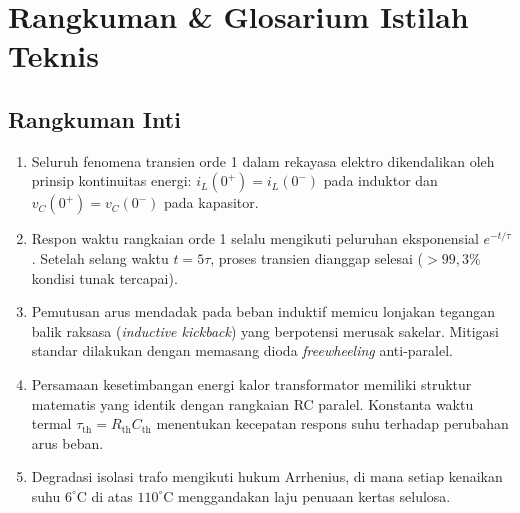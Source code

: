 \documentclass[11pt,a4paper]{article}
\theoremstyle{definition}
\begin{document}
\section{Rangkuman \& Glosarium Istilah Teknis}

\subsection{Rangkuman Inti}
\begin{enumerate}[leftmargin=*]
    \item Seluruh fenomena transien orde 1 dalam rekayasa elektro dikendalikan oleh prinsip kontinuitas energi: $i_L(0^+) = i_L(0^-)$ pada induktor dan $v_C(0^+) = v_C(0^-)$ pada kapasitor.
    \item Respon waktu rangkaian orde 1 selalu mengikuti peluruhan eksponensial $e^{-t/\tau}$. Setelah selang waktu $t = 5\tau$, proses transien dianggap selesai ($>99{,}3\%$ kondisi tunak tercapai).
    \item Pemutusan arus mendadak pada beban induktif memicu lonjakan tegangan balik raksasa (\textit{inductive kickback}) yang berpotensi merusak sakelar. Mitigasi standar dilakukan dengan memasang dioda \textit{freewheeling} anti-paralel.
    \item Persamaan kesetimbangan energi kalor transformator memiliki struktur matematis yang identik dengan rangkaian RC paralel. Konstanta waktu termal $\tau_{\text{th}} = R_{\text{th}} C_{\text{th}}$ menentukan kecepatan respons suhu terhadap perubahan arus beban.
    \item Degradasi isolasi trafo mengikuti hukum Arrhenius, di mana setiap kenaikan suhu $6^\circ\text{C}$ di atas $110^\circ\text{C}$ menggandakan laju penuaan kertas selulosa.
\end{enumerate}
\end{document}
